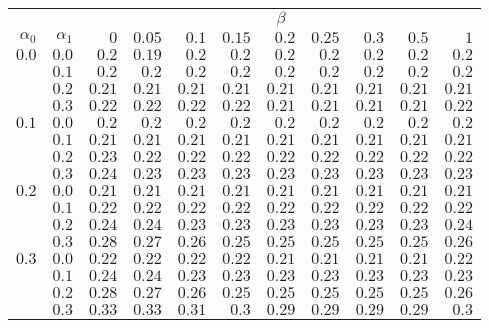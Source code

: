 \begin{tabular}{rr|rrrrrrrrr}
\hline\hline
 && \multicolumn{9}{c}{$\beta$}\\
 $\alpha_0$ & $\alpha_1$ & $0$ & $0.05$ & $0.1$ & $0.15$ & $0.2$ & $0.25$ & $0.3$ & $0.5$ & $1$ \\ 
 \hline
$0.0$ & $0.0$ & $0.2$ & $0.19$ & $0.2$ & $0.2$ & $0.2$ & $0.2$ & $0.2$ & $0.2$ & $0.2$\\ 
 & $0.1$ & $0.2$ & $0.2$ & $0.2$ & $0.2$ & $0.2$ & $0.2$ & $0.2$ & $0.2$ & $0.2$\\ 
 & $0.2$ & $0.21$ & $0.21$ & $0.21$ & $0.21$ & $0.21$ & $0.21$ & $0.21$ & $0.21$ & $0.21$\\ 
 & $0.3$ & $0.22$ & $0.22$ & $0.22$ & $0.22$ & $0.21$ & $0.21$ & $0.21$ & $0.21$ & $0.22$\\ 
\hline 
 $0.1$ & $0.0$ & $0.2$ & $0.2$ & $0.2$ & $0.2$ & $0.2$ & $0.2$ & $0.2$ & $0.2$ & $0.2$\\ 
 & $0.1$ & $0.21$ & $0.21$ & $0.21$ & $0.21$ & $0.21$ & $0.21$ & $0.21$ & $0.21$ & $0.21$\\ 
 & $0.2$ & $0.23$ & $0.22$ & $0.22$ & $0.22$ & $0.22$ & $0.22$ & $0.22$ & $0.22$ & $0.22$\\ 
 & $0.3$ & $0.24$ & $0.23$ & $0.23$ & $0.23$ & $0.23$ & $0.23$ & $0.23$ & $0.23$ & $0.23$\\ 
\hline 
 $0.2$ & $0.0$ & $0.21$ & $0.21$ & $0.21$ & $0.21$ & $0.21$ & $0.21$ & $0.21$ & $0.21$ & $0.21$\\ 
 & $0.1$ & $0.22$ & $0.22$ & $0.22$ & $0.22$ & $0.22$ & $0.22$ & $0.22$ & $0.22$ & $0.22$\\ 
 & $0.2$ & $0.24$ & $0.24$ & $0.23$ & $0.23$ & $0.23$ & $0.23$ & $0.23$ & $0.23$ & $0.24$\\ 
 & $0.3$ & $0.28$ & $0.27$ & $0.26$ & $0.25$ & $0.25$ & $0.25$ & $0.25$ & $0.25$ & $0.26$\\ 
\hline 
 $0.3$ & $0.0$ & $0.22$ & $0.22$ & $0.22$ & $0.22$ & $0.21$ & $0.21$ & $0.21$ & $0.21$ & $0.22$\\ 
 & $0.1$ & $0.24$ & $0.24$ & $0.23$ & $0.23$ & $0.23$ & $0.23$ & $0.23$ & $0.23$ & $0.23$\\ 
 & $0.2$ & $0.28$ & $0.27$ & $0.26$ & $0.25$ & $0.25$ & $0.25$ & $0.25$ & $0.25$ & $0.26$\\ 
 & $0.3$ & $0.33$ & $0.33$ & $0.31$ & $0.3$ & $0.29$ & $0.29$ & $0.29$ & $0.29$ & $0.3$\\ 
 \hline 
 \end{tabular}